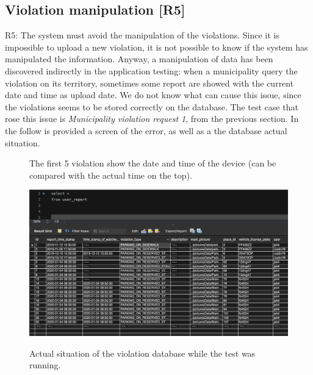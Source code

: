 \documentclass[../ATD.tex]{subfiles}
\begin{document}
    \subsection{Violation manipulation [R5]}\label{subsec:violation-manipulation.}
    R5: The system must avoid the manipulation of the violations.
    \newline
    Since it is impossible to upload a new violation, it is not possible to know if the system has manipulated the information.
    Anyway, a manipulation of data has been discovered indirectly in the application testing: when a municipality query the violation on its territory, sometimes some report are showed with the current date and time as upload date.
    We do not know what can cause this issue, since the violations seems to be stored correctly on the database.
    The test case that rose this issue is \textit{Municipality violation request 1}, from the previous section.
    In the follow is provided a screen of the error, as well as a the database actual situation.

    \begin{figure}[H]
        \centering
        \caption[Violation manipulation]{The first 5 violation show the date and time of the device (can be compared with the actual time on the top).}
    \end{figure}

    \begin{figure}[H]
        \centering
        \includegraphics[scale = 0.5]{assets/database_user_report.png}\\
        \caption[Situation of the database]{Actual situation of the violation database while the test was running.}
    \end{figure}
\end{document}
